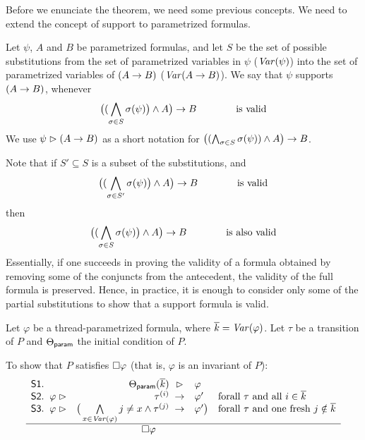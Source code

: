 Before we enunciate the theorem, we need some previous concepts.
%
We need to extend the concept of support to parametrized formulas.


\begin{defn}[Support]
  Let $\psi$, $A$ and $B$ be parametrized formulas, and let $S$ be the
  set of possible substitutions from the set of parametrized variables in $\psi$ ($\mathit{Var}(\psi)$) into the set of parametrized variables of $(A\mathrel{\rightarrow} B)$ ($\mathit{Var}(A\mathrel{\rightarrow} B)$).
%
  We say that $\psi$ supports $(A\mathrel{\rightarrow} B)$, whenever
%
  \[ \big( (\bigwedge_{\sigma\in S} \sigma(\psi)\big) \wedge A\big) \mathrel{\rightarrow} B \hspace{4em} \text{is valid} \]
%
  We use $\psi\mathrel{\rhd}(A\mathrel{\rightarrow} B)$ as a short notation for
  $\big((\bigwedge_{\sigma\in S} \sigma(\psi)) \wedge A\big) \mathrel{\rightarrow} B$.  
\end{defn}
Note that if $S'\subseteq S$ is a subset of the substitutions, and 
%
  \[ \big( (\bigwedge_{\sigma\in S'} \sigma(\psi)\big) \wedge A\big) \mathrel{\rightarrow} B \hspace{4em} \text{is valid} \]
%
then
%
  \[ \big( (\bigwedge_{\sigma\in S} \sigma(\psi)\big) \wedge A\big) \mathrel{\rightarrow} B \hspace{4em} \text{is also valid} \]
%
  Essentially, if one succeeds in proving the validity of a formula obtained by removing some of the conjuncts from the antecedent, the validity of the full formula is preserved.
%
  Hence, in practice, it is enough to consider only some of the partial substitutions to show that a support formula is valid.


\begin{itheorem}
	Let $\varphi$ be a thread-parametrized formula, where $\overline{k}=\mathit{Var}(\varphi)$. 
	Let $\tau$ be a transition of $P$ and $\Theta_{\textsf{param}}$ the initial condition of $P$.

	To show that $P$ satisfies $\square\varphi$ (that is, $\varphi$ is an invariant of $P$):
	\hspace{-1em}
	\[ 
		\begin{array}{r@{\;\;}lr@{\;}@{\;}cl@{\hspace{1em}}l}
			\Premise{S1}. & & \ThetaParam(\overline{k}) &\supports & \varphi & \\

			\Premise{S2}. & \varphi \supports & \tau^{(i)} &\Into& \varphi'  & \text{forall $\tau$ and all $i\in \overline{k}$}\\
			\Premise{S3}. & \varphi\supports & \big(\bigwedge\limits_{x\in\Var(\varphi)} j\neq x \andcond \tau^{(j)} &\Into& \varphi' \big)& \text{forall $\tau$ and one fresh $j\notin\overline{k}$}\\ \hline
			& \multicolumn{4}{c}{\hspace{3em} \Always \varphi} &
		\end{array}
	\]
\label{thm:biggest}
\end{itheorem}



